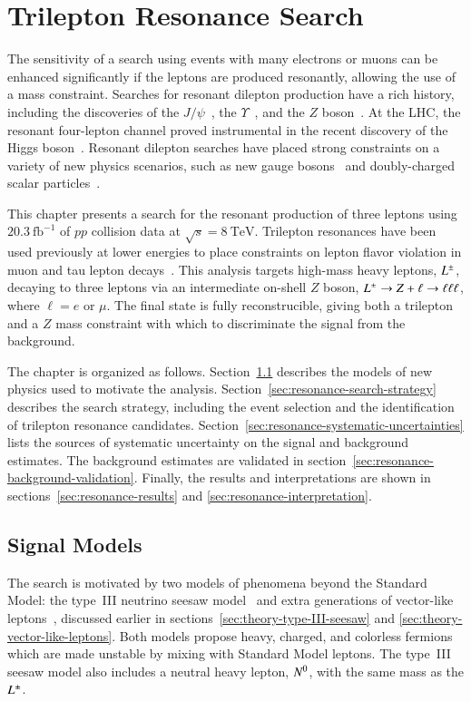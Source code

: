 \chapter{Trilepton Resonance Search}\label{ch:trilepton-resonance-search}
The sensitivity of a search using events with many electrons or muons can be enhanced significantly if the leptons are produced resonantly, allowing the use of a mass constraint. Searches for resonant dilepton production have a rich history, including the discoveries of the $J/\psi$~\cite{jpsi1,jpsi2}, the $\Upsilon$~\cite{upsilon}, and the $Z$ boson~\cite{zua1}. At the LHC, the resonant four-lepton channel proved instrumental in the recent discovery of the Higgs boson~\cite{TheATLASCollaboration:2012cp,TheCMSCollaboration:2012dl}. Resonant dilepton searches have placed strong constraints on a variety of new physics scenarios, such as new gauge bosons~\cite{TheATLASCollaboration:2014eb,TheCMSCollaboration:2015fm} and doubly-charged scalar particles~\cite{TheATLASCollaboration:2015gu}. 

This chapter presents a search for the resonant production of three leptons using $20.3~\mbox{fb}^{-1}$ of $pp$ collision data at $\sqrt{s}=8~\mbox{TeV}$. Trilepton resonances have been used previously at lower energies to place constraints on lepton flavor violation in muon and tau lepton decays~\cite{Bellgardt:1987du,taulll}. This analysis targets high-mass heavy leptons, $L^{\pm}$, decaying to three leptons via an intermediate on-shell $Z$ boson, $L^{\pm} \rightarrow Z+\ell \rightarrow \ell\ell\ell$, where $\ell=e$ or $\mu$. The final state is fully reconstrucible, giving both a trilepton and a $Z$ mass constraint with which to discriminate the signal from the background.

The chapter is organized as follows. Section~\ref{sec:resonance-signal-models} describes the models of new physics used to motivate the analysis. Section~\ref{sec:resonance-search-strategy} describes the search strategy, including the event selection and the identification of trilepton resonance candidates. Section~\ref{sec:resonance-systematic-uncertainties} lists the sources of systematic uncertainty on the signal and background estimates. The background estimates are validated in section~\ref{sec:resonance-background-validation}. Finally, the results and interpretations are shown in sections~\ref{sec:resonance-results} and \ref{sec:resonance-interpretation}. 

\section{Signal Models}\label{sec:resonance-signal-models}
The search is motivated by two models of phenomena beyond the Standard Model: the type~III neutrino seesaw model~\cite{Biggio:1368793} and extra generations of vector-like leptons~\cite{Martin:2009it}, discussed earlier in sections~\ref{sec:theory-type-III-seesaw} and \ref{sec:theory-vector-like-leptons}. Both models propose heavy, charged, and colorless fermions which are made unstable by mixing with Standard Model leptons. The type~III seesaw model also includes a neutral heavy lepton, $N^{0}$, with the same mass as the $L^{\pm}$. 

